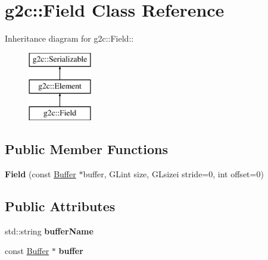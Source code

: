 \hypertarget{classg2c_1_1_field}{
\section{g2c::Field Class Reference}
\label{classg2c_1_1_field}
}
Inheritance diagram for g2c::Field::\begin{figure}[H]
\begin{center}
\leavevmode
\includegraphics[height=3cm]{classg2c_1_1_field}
\end{center}
\end{figure}
\subsection*{Public Member Functions}
\begin{DoxyCompactItemize}
\item 
\hypertarget{classg2c_1_1_field_a45932bbf099d28660b010db9c6d17c00}{
{\bfseries Field} (const \hyperlink{classg2c_1_1_buffer}{Buffer} $\ast$buffer, GLint size, GLsizei stride=0, int offset=0)}
\label{classg2c_1_1_field_a45932bbf099d28660b010db9c6d17c00}

\end{DoxyCompactItemize}
\subsection*{Public Attributes}
\begin{DoxyCompactItemize}
\item 
\hypertarget{classg2c_1_1_field_a34877f3f69bd46424d88ec61f9d02da4}{
std::string {\bfseries bufferName}}
\label{classg2c_1_1_field_a34877f3f69bd46424d88ec61f9d02da4}

\item 
\hypertarget{classg2c_1_1_field_aae940634905af081ccc8dd1e3531c1ac}{
const \hyperlink{classg2c_1_1_buffer}{Buffer} $\ast$ {\bfseries buffer}}
\label{classg2c_1_1_field_aae940634905af081ccc8dd1e3531c1ac}

\end{DoxyCompactItemize}
